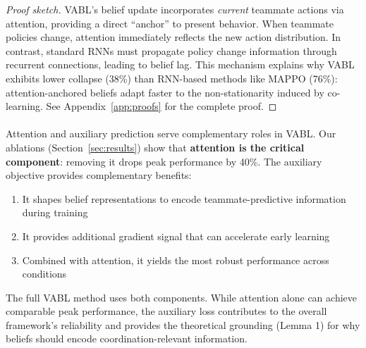\documentclass{article}
\theoremstyle{plain}
\theoremstyle{definition}
\theoremstyle{remark}
\begin{document}
\begin{proof}[Proof sketch]
VABL's belief update incorporates \emph{current} teammate actions via attention, providing a direct ``anchor'' to present behavior. When teammate policies change, attention immediately reflects the new action distribution. In contrast, standard RNNs must propagate policy change information through recurrent connections, leading to belief lag. This mechanism explains why VABL exhibits lower collapse (38\%) than RNN-based methods like MAPPO (76\%): attention-anchored beliefs adapt faster to the non-stationarity induced by co-learning. See Appendix~\ref{app:proofs} for the complete proof.
\end{proof}

\paragraph{}
Attention and auxiliary prediction serve complementary roles in VABL. Our ablations (Section~\ref{sec:results}) show that \textbf{attention is the critical component}: removing it drops peak performance by 40\%. The auxiliary objective provides complementary benefits:
\begin{enumerate}
\item It shapes belief representations to encode teammate-predictive information during training
\item It provides additional gradient signal that can accelerate early learning
\item Combined with attention, it yields the most robust performance across conditions
\end{enumerate}
The full VABL method uses both components. While attention alone can achieve comparable peak performance, the auxiliary loss contributes to the overall framework's reliability and provides the theoretical grounding (Lemma 1) for why beliefs should encode coordination-relevant information.
\end{document}
